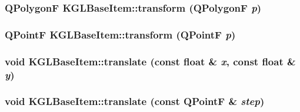 \hypertarget{class_k_g_l_base_item_8df2be0816e3d24bf9adb5f0a01d186b}{
\subsubsection[{transform}]{\setlength{\rightskip}{0pt plus 5cm}QPolygonF KGLBaseItem::transform (QPolygonF {\em p})}}
\label{class_k_g_l_base_item_8df2be0816e3d24bf9adb5f0a01d186b}


\hypertarget{class_k_g_l_base_item_3825639b143ff214e96749f375449675}{
\subsubsection[{transform}]{\setlength{\rightskip}{0pt plus 5cm}QPointF KGLBaseItem::transform (QPointF {\em p})}}
\label{class_k_g_l_base_item_3825639b143ff214e96749f375449675}


\hypertarget{class_k_g_l_base_item_69f7ca20cd192bd7ccc5bfdaeac4e60e}{
\subsubsection[{translate}]{\setlength{\rightskip}{0pt plus 5cm}void KGLBaseItem::translate (const float \& {\em x}, \/  const float \& {\em y})}}
\label{class_k_g_l_base_item_69f7ca20cd192bd7ccc5bfdaeac4e60e}


\hypertarget{class_k_g_l_base_item_a953c569ebcb00d8e9f8a7a88a730930}{
\subsubsection[{translate}]{\setlength{\rightskip}{0pt plus 5cm}void KGLBaseItem::translate (const QPointF \& {\em step})}}
\label{class_k_g_l_base_item_a953c569ebcb00d8e9f8a7a88a730930}


